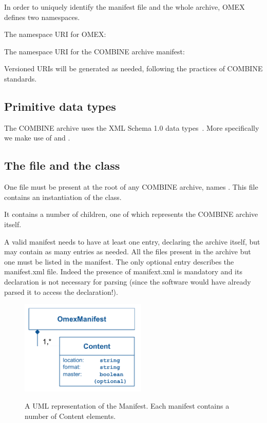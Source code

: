 In order to uniquely identify the manifest file and the whole archive, OMEX defines two namespaces.

The namespace URI for OMEX: 

\begin{quote}
\end{quote}

The namespace URI for the COMBINE archive manifest: 

\begin{quote}
\end{quote}

Versioned URIs will be generated as needed, following the practices of COMBINE standards.


\subsection{Primitive data types}
\label{primtypes}

The COMBINE archive uses the XML Schema 1.0 data types~\citep{biron:2000}.
More specifically we make use of  and .

\subsection{The  file and the  class}
\label{manifest-class}

One file must be present at the root of any COMBINE archive, names . This file contains an instantiation of the \OmexManifest class. 

It contains a number of \Content children, one of which represents the COMBINE archive itself. 

A valid manifest needs to have at least one entry, declaring the archive itself, but may 
contain as many entries as needed. All the files present in the archive but one must be listed in the manifest. The only optional entry describes the manifest.xml file. Indeed the presence of manifext.xml is mandatory and its declaration is not necessary for parsing (since the software would have already parsed it to access the declaration!).

\begin{figure}[h!]
  \centering
  \includegraphics[width=6cm]{images/OmexManifest.pdf}\\
  \caption{A UML representation of the Manifest. Each manifest contains a number of Content elements.}
  \label{fig:combine_uml}
\end{figure}


